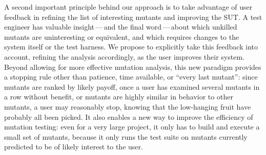 A second important principle behind our approach is to take advantage of user
feedback in refining the list of interesting mutants and improving the SUT.
A test engineer has valuable insight\,---\,and the final word\,---\,about which
unkilled mutants are uninteresting or equivalent, and which requires changes to
the system itself or the test harness.  We propose to explicitly take this
feedback into account, refining the analysis accordingly, as the user improves
their system.  Beyond allowing for more effective mutation analysis, 
this new paradigm provides a stopping rule other than patience, time available, or
``every last mutant'':  since mutants are ranked by likely payoff, once a user
has examined several mutants in a row without benefit, or mutants are highly
similar in behavior to other mutants, a user may reasonably stop, knowing that
the low-hanging fruit have probably all been picked.  
 It also enables a new way to improve the efficiency of
mutation testing:  even for a very large project, it only has to build and
execute a small set of mutants, because it only runs the test suite on mutants
currently predicted to be of likely interest to the user.  

